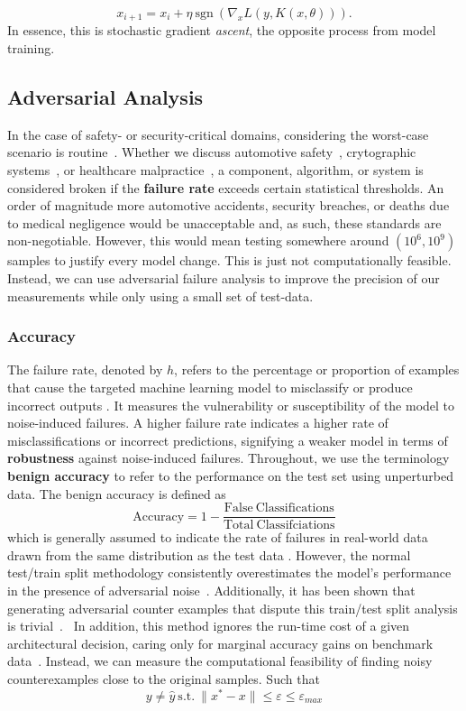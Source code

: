 \documentclass[conference]{IEEEtran}
\begin{document}
$$
x_{i+1} = x_{i} + \eta \mathrm{~sgn~}(\nabla_x L(y, K(x, \theta))).
$$
In essence, this is stochastic gradient \textit{ascent}, the opposite process from model training.

\subsection{Adversarial Analysis}

In the case of safety- or security-critical domains, considering the worst-case scenario is routine~\cite{}. Whether we discuss automotive safety~\cite{}, crytographic systems~\cite{}, or healthcare malpractice~\cite{}, a component, algorithm, or system is considered broken if the \textbf{failure rate} exceeds certain statistical thresholds. An order of magnitude more automotive accidents, security breaches, or deaths due to medical negligence would be unacceptable and, as such, these standards are non-negotiable. However, this would mean testing somewhere around $(10^6, 10^9)$ samples to justify every model change. This is just not computationally feasible. Instead, we can use adversarial failure analysis to improve the precision of our measurements while only using a small set of test-data.

\subsubsection{Accuracy}
The failure rate, denoted by $h$, refers to the percentage or proportion of examples that cause the targeted machine learning model to misclassify or produce incorrect outputs \cite{meyers}. It measures the vulnerability or susceptibility of the model to noise-induced failures. A higher failure rate indicates a higher rate of misclassifications or incorrect predictions, signifying a weaker model in terms of \textbf{robustness} against noise-induced failures. Throughout, we use the terminology \textbf{benign accuracy} to refer to the performance on the test set using unperturbed data. The benign accuracy is defined as
\begin{equation}
 \mathrm{Accuracy} = 1 - \frac{\mathrm{False~Classifications}}{\mathrm{Total~Classifciations}}
\label{eq:acc}
\end{equation}
which is generally assumed to indicate the rate of failures in real-world data drawn from the same distribution as the test data \cite{}. However, the normal test/train split methodology consistently overestimates the model's performance in the presence of adversarial noise~\cite{croce_reliable_2020}. Additionally, it has been shown that generating adversarial counter examples that dispute this train/test split analysis is trivial~\cite{biggio_evasion_2013,carlini_towards_2017,adversarialpatch,pixelattack,hopskipjump,biggio_poisoning_2013,chakraborty_adversarial_2018,dohmatob_generalized_2019,meyers}.
\ In addition, this method ignores the run-time cost of a given architectural decision, caring only for marginal accuracy gains on benchmark data~\cite{}. Instead, we can measure the computational feasibility of finding noisy counterexamples close to the original samples. Such that 
$$
y\neq\hat{y}\mathrm{~s.t.~}\| x^* - x \| \leq \varepsilon \leq \varepsilon_{max}
$$ 
\end{document}
